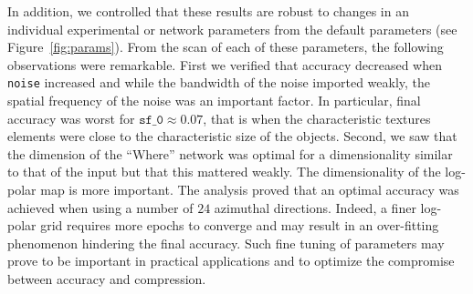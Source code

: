 In addition, we controlled that these results are robust to changes in an individual experimental or network parameters from the default parameters (see Figure~\ref{fig:params}). From the scan of each of these parameters, the following observations were remarkable. First we verified that accuracy decreased when \texttt{noise} increased and while the bandwidth of the noise imported weakly, the spatial frequency of the noise was an important factor. In particular, final accuracy was worst for $\texttt{sf\_0} \approx 0.07$, that is when the characteristic textures elements were close to the characteristic size of the objects. Second, we saw that the dimension of the ``Where'' network was optimal for a dimensionality similar to that of the input but that this mattered weakly. The dimensionality of the log-polar map is more important. The analysis proved that an optimal accuracy was achieved when using a number of $24$ azimuthal directions. Indeed, a finer log-polar grid requires more epochs to converge and may result in an over-fitting phenomenon hindering the final accuracy. Such fine tuning of parameters may prove to be important in practical applications and to optimize the compromise between accuracy and compression. 
